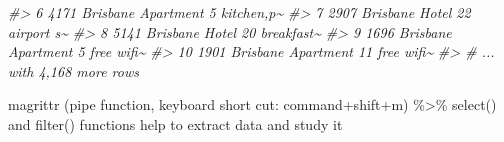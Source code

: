 \documentclass[
]{article}
\newenvironment{Shaded}{\begin{snugshade}}{\end{snugshade}}
\newcommand{\CommentTok}[1]{\textcolor[rgb]{0.56,0.35,0.01}{\textit{#1}}}
\begin{document}
\begin{Shaded}
\begin{Highlighting}[]
\CommentTok{\#\textgreater{}  6        4171 Brisbane    Apartment            5 kitchen,p\textasciitilde{}}
\CommentTok{\#\textgreater{}  7        2907 Brisbane    Hotel               22 airport s\textasciitilde{}}
\CommentTok{\#\textgreater{}  8        5141 Brisbane    Hotel               20 breakfast\textasciitilde{}}
\CommentTok{\#\textgreater{}  9        1696 Brisbane    Apartment            5 free wifi\textasciitilde{}}
\CommentTok{\#\textgreater{} 10        1901 Brisbane    Apartment           11 free wifi\textasciitilde{}}
\CommentTok{\#\textgreater{} \# ... with 4,168 more rows}
\end{Highlighting}
\end{Shaded}

magrittr (pipe function, keyboard short cut: command+shift+m)
\%\textgreater\%
select() and filter() functions help to extract data and study it
\end{document}
